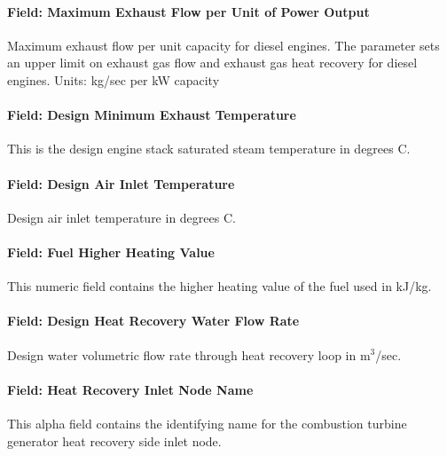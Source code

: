 \paragraph{Field: Maximum Exhaust Flow per Unit of Power Output}\label{field-maximum-exhaust-flow-per-unit-of-power-output-1}

Maximum exhaust flow per unit capacity for diesel engines. The parameter sets an upper limit on exhaust gas flow and exhaust gas heat recovery for diesel engines. Units: kg/sec per kW capacity

\paragraph{Field: Design Minimum Exhaust Temperature}\label{field-design-minimum-exhaust-temperature-1}

This is the design engine stack saturated steam temperature in degrees C.

\paragraph{Field: Design Air Inlet Temperature}\label{field-design-air-inlet-temperature}

Design air inlet temperature in degrees C.

\paragraph{Field: Fuel Higher Heating Value}\label{field-fuel-higher-heating-value-1}

This numeric field contains the higher heating value of the fuel used in kJ/kg.

\paragraph{Field: Design Heat Recovery Water Flow Rate}\label{field-design-heat-recovery-water-flow-rate-1}

Design water volumetric flow rate through heat recovery loop in m\(^{3}\)/sec.

\paragraph{Field: Heat Recovery Inlet Node Name}\label{field-heat-recovery-inlet-node-name-1}

This alpha field contains the identifying name for the combustion turbine generator heat recovery side inlet node.

